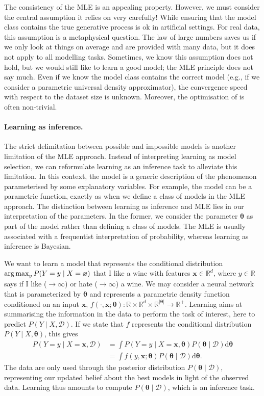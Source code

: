 The consistency of the MLE is an appealing property. However, we must consider the central assumption it relies on very carefully! While ensuring that the model class contains the true generative process is ok in artificial settings. For real data, this assumption is a metaphysical question. The law of large numbers saves us if we only look at things on average and are provided with many data, but it does not apply to all modelling tasks. Sometimes, we know this assumption does not hold, but we would still like to learn a good model; the MLE principle does not say much. Even if we know the model class contains the correct model (e.g., if we consider a parametric universal density approximator), the convergence speed with respect to the dataset size is unknown. Moreover, the optimisation of  is often non-trivial.


\paragraph{Learning as inference.}
The strict delimitation between possible and impossible models is another limitation of the MLE approach. Instead of interpreting learning as model selection, we can reformulate learning as an inference task to alleviate this limitation. In this context, the model is a generic description of the phenomenon parameterised by some explanatory variables. For example, the model can be a parametric function, exactly as when we define a class of models in the MLE approach. The distinction between learning as inference and MLE lies in our interpretation of the parameters. In the former, we consider the parameter $\bm \theta$ as part of the model rather than defining a class of models. The MLE is usually associated with a frequentist interpretation of probability, whereas learning as inference is Bayesian.

We want to learn a model that represents the conditional distribution $\operatorname*{arg\,max}_y P(Y=y\mid X=\bm x)$ that I like a wine with features $\bm x \in \mathbb{R}^d$, where $y \in \mathbb{R}$ says if I like ($\rightarrow \infty$) or hate ($\rightarrow \infty$) a wine. We may consider a neural network that is parameterized by $\bm \theta$ and represents a parametric density function conditioned on an input $\bm x$, $f(\cdot, \bm x;\bm \theta): \mathbb{R} \times \mathbb{R}^{d} \times \mathbb{R}^{\lvert\bm \theta\rvert} \rightarrow \mathbb{R}^+$.
Learning aims at summarising the information in the data to perform the task of interest, here to predict $P(Y \mid X, \mathcal{D})$.
If we state that $f$ represents the conditional distribution $P(Y\mid X, \bm \theta)$, this gives
\begin{align}
  P(Y=y\mid X=\bm x, \mathcal{D}) &= \int P(Y=y\mid X=\bm x, \bm \theta) P(\bm \theta \mid \mathcal{D}) \text{d}\bm{\theta}\\
  &=\int f(y, \bm x;\bm \theta) P(\bm \theta \mid  \mathcal{D}) \text{d}\bm{\theta}.
\end{align}
The data are only used through the posterior distribution $P(\bm \theta  \mid  \mathcal{D})$, representing our updated belief about the best models in light of the observed data. Learning thus amounts to compute $P(\bm \theta \mid \mathcal{D})$, which is an inference task.

